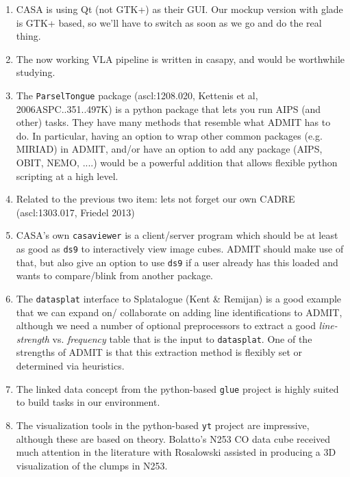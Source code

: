 \documentclass[preprint]{aastex} %
\begin{document}
\begin{enumerate}

\item
CASA is using Qt (not GTK+) as their GUI. Our mockup version with glade is GTK+ based,
so we'll have to switch as soon as we go and do the real thing.

\item
The now working VLA pipeline is written in casapy, and would be worthwhile studying.

\item
The {\tt ParselTongue} package (ascl:1208.020, Kettenis et al, 2006ASPC..351..497K)
is a python package that lets you run AIPS (and other) tasks. 
They have many methods that resemble what ADMIT has to do. In particular, having
an option to wrap other common packages (e.g. MIRIAD) in ADMIT, and/or have an option
to add any package (AIPS, OBIT, NEMO, ....) would be a powerful addition
that allows flexible python scripting at a high level.

\item
Related to the previous two item: lets not forget our own CADRE (ascl:1303.017, Friedel 2013)

\item
CASA's own {\tt casaviewer} is a client/server program which should be at least as good
as {\tt ds9} to interactively view image cubes. ADMIT should make use of that, but also
give an option to use {\tt ds9} if a user already has this loaded and wants to compare/blink  
from another package.

\item
The {\tt datasplat} interface to Splatalogue (Kent \& Remijan) is 
a good example that we can expand on/ collaborate
on adding line identifications to ADMIT, although we need a number of optional preprocessors
to extract a good {\it line-strength} vs. {\it frequency} table that is the input 
to {\tt datasplat}. One of the strengths of ADMIT is that this extraction method is
flexibly set or determined via heuristics.

\item
The linked data concept from the python-based 
{\tt glue} project is highly suited to build tasks in our environment.

\item
The visualization tools in the python-based {\tt yt} project are impressive, although
these are based on theory. Bolatto's N253 CO data cube received much attention in the
literature with Rosalowski assisted in producing a 3D visualization of the clumps
in N253.



\end{enumerate}
\end{document}
